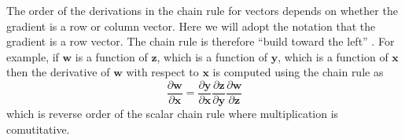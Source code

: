 \documentclass[11pt,a4paper]{report}
\begin{document}
The order of the derivations in the chain rule for vectors depends on whether the gradient is a row or column
vector. Here we will adopt the notation that the gradient is a row vector. The
chain rule is therefore ``build toward the left'' \cite{ifemcolorado}. For example, if $\mathbf{w}$
is a function of $\mathbf{z}$, which is a function of $\mathbf{y}$, which is a
function of $\mathbf{x}$ then the derivative of $\mathbf{w}$ with respect to
$\mathbf{x}$ is computed using the chain rule as
\begin{equation*}
\frac{\partial \mathbf{w}}{\partial \mathbf{x}} = \frac{\partial
  \mathbf{y}}{\partial \mathbf{x}}\frac{\partial \mathbf{z}}{\partial
  \mathbf{y}}\frac{\partial \mathbf{w}}{\partial \mathbf{z}} 
\end{equation*}
which is reverse order of the scalar chain rule where multiplication is
comutitative.
\end{document}
